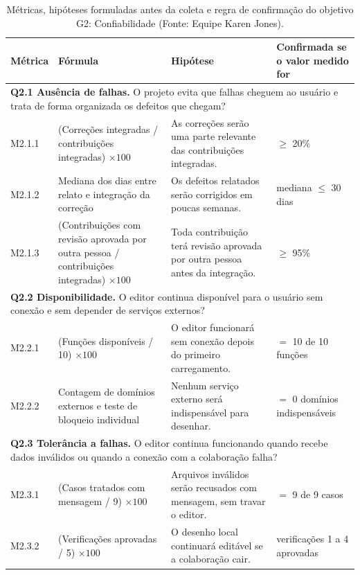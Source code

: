 \documentclass[12pt]{article}
\renewcommand{\arraystretch}{0.9}
\begin{document}
\begin{table}[!ht]
\centering
\caption{Métricas, hipóteses formuladas antes da coleta e regra de confirmação do objetivo G2: Confiabilidade (Fonte: Equipe Karen Jones).}
\label{tab:g2-metricas}
\vspace{2pt}
\scriptsize
\setlength{\tabcolsep}{3pt}
\renewcommand{\arraystretch}{0.90}
\begin{tabular}{p{1.2cm}p{5.5cm}p{5.0cm}p{3.6cm}}
\toprule
\textbf{Métrica} & \textbf{Fórmula} & \textbf{Hipótese} & \textbf{Confirmada se o valor medido for} \\
\midrule
\multicolumn{4}{p{16.2cm}}{\textbf{Q2.1 Ausência de falhas.} O projeto evita que falhas cheguem ao usuário e trata de forma organizada os defeitos que chegam?} \\
M2.1.1 & (Correções integradas / contribuições integradas) $\times 100$ & As correções serão uma parte relevante das contribuições integradas. & $\geq$ 20\% \\
M2.1.2 & Mediana dos dias entre relato e integração da correção & Os defeitos relatados serão corrigidos em poucas semanas. & mediana $\leq$ 30 dias \\
M2.1.3 & (Contribuições com revisão aprovada por outra pessoa / contribuições integradas) $\times 100$ & Toda contribuição terá revisão aprovada por outra pessoa antes da integração. & $\geq$ 95\% \\
\midrule
\multicolumn{4}{p{16.2cm}}{\textbf{Q2.2 Disponibilidade.} O editor continua disponível para o usuário sem conexão e sem depender de serviços externos?} \\
M2.2.1 & (Funções disponíveis / 10) $\times 100$ & O editor funcionará sem conexão depois do primeiro carregamento. & $=$ 10 de 10 funções \\
M2.2.2 & Contagem de domínios externos e teste de bloqueio individual & Nenhum serviço externo será indispensável para desenhar. & $=$ 0 domínios indispensáveis \\
\midrule
\multicolumn{4}{p{16.2cm}}{\textbf{Q2.3 Tolerância a falhas.} O editor continua funcionando quando recebe dados inválidos ou quando a conexão com a colaboração falha?} \\
M2.3.1 & (Casos tratados com mensagem / 9) $\times 100$ & Arquivos inválidos serão recusados com mensagem, sem travar o editor. & $=$ 9 de 9 casos \\
M2.3.2 & (Verificações aprovadas / 5) $\times 100$ & O desenho local continuará editável se a colaboração cair. & verificações 1 a 4 aprovadas \\

\end{tabular}
\end{table}
\end{document}
